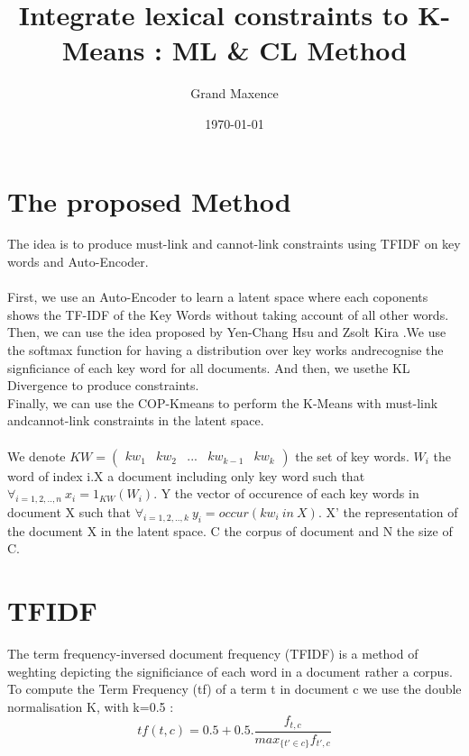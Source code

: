 \documentclass{article}
\title{Integrate lexical constraints to K-Means : ML \& CL Method}
\author{Grand Maxence}
\date{\today}
\begin{document}
\maketitle
\justify

\section{The proposed Method}

The idea is to produce must-link and cannot-link constraints using
TFIDF on key words and Auto-Encoder.\\ \\
First, we use an Auto-Encoder to learn a latent space where each
coponents shows the TF-IDF of the Key Words without taking account of
all other words.\\Then, we can use the idea proposed by Yen-Chang Hsu
and Zsolt Kira \cite{2015arXiv151106321H}.We use the softmax function
for having a distribution over key works andrecognise the signficiance
of each key word for all documents. And then, we usethe KL Divergence
to produce constraints.\\Finally, we can use the COP-Kmeans to perform
the K-Means with must-link andcannot-link constraints in the latent
space\cite{Wagstaff:2001:CKC:645530.655669}\cite{2016arXiv161004794Y}.
\\ \\
We denote $KW = \begin{pmatrix} kw_1 & kw_2 & ... & kw_{k-1} & kw_{k}
\end {pmatrix}$
the set of key words. $W_i$ the word of index i.X a document including
only key word such that $\forall_{i = 1,2,..,n}~x_i = 1_{KW}(W_i)$.
Y the vector of occurence of each key words in document X such that
$\forall_{i=1, 2, .., k}~y_i = occur(kw_i~in~X)$. X' the representation of
the document X in the latent space. C the corpus of document and N the
size of C.

\section{TFIDF}

The term frequency-inversed document frequency (TFIDF) is a method of
weghting depicting the significiance of each word in a document rather
a corpus.
\\
To compute the Term Frequency (tf) of a term t in document c we use
the double normalisation K, with k=0.5 :  
\begin{equation}\label{eq:tf}
  tf(t, c) = 0.5 + 0.5.\frac{f_{t,c}}{max_{\{t' \in c \}}f_{t',c}}
\end{equation}
\end{document}
